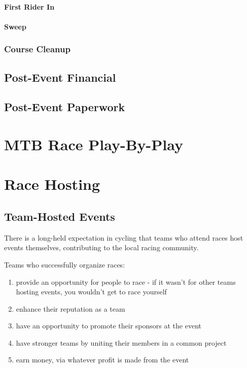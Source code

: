 \documentclass[
  letterpaper, %
  fontsize=10pt, %
  twoside=true,
  chapterentrydots=true, %
  numbers=noenddot,
  fontmethod=tex,
]{kaobook}
\begin{document}
\subsubsection{First Rider In}

\subsubsection{Sweep}

\subsection{Course Cleanup}

\section{Post-Event Financial}

\section{Post-Event Paperwork}

\setchapterpreamble[u]{\margintoc}
\chapter{MTB Race Play-By-Play}


\setchapterpreamble[u]{\margintoc}
\chapter{Race Hosting}

\section{Team-Hosted Events}

There is a long-held expectation in cycling that teams who attend races host events themselves,
contributing to the local racing community.

Teams who successfully organize races:
\begin{enumerate}
  \item provide an opportunity for people to race - if it wasn't for other teams hosting events, you wouldn't get to race yourself
  \item enhance their reputation as a team
  \item have an opportunity to promote their sponsors at the event
  \item have stronger teams by uniting their members in a common project
  \item earn money, via whatever profit is made from the event
\end{enumerate}
\end{document}

